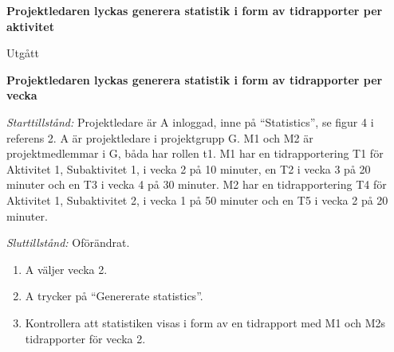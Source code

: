 \documentclass[a4paper]{article}
\begin{document}
\begin{FT}
\item
\textbf{Projektledaren lyckas generera statistik i form av tidrapporter per aktivitet}

Utgått





\item
\textbf{Projektledaren lyckas generera statistik i form av tidrapporter per vecka}

\emph{Starttillstånd:} Projektledare är A inloggad, inne på ``Statistics'', se figur 4 i referens 2. A är projektledare i projektgrupp G. M1 och M2 är projektmedlemmar i G, båda har rollen t1. M1 har en tidrapportering T1 för Aktivitet 1, Subaktivitet 1, i vecka 2 på 10 minuter, en T2 i vecka 3 på 20 minuter och en T3 i vecka 4 på 30 minuter. M2 har en tidrapportering T4 för Aktivitet 1, Subaktivitet 2, i vecka 1 på 50 minuter och en T5 i vecka 2 på 20 minuter.

\emph{Sluttillstånd:} Oförändrat.

\begin{enumerate}
\item A väljer vecka 2.
\item A trycker på ``Genererate statistics''.
\item Kontrollera att statistiken visas i form av en tidrapport med M1 och M2s tidrapporter för vecka 2.
\end{enumerate}



\end{FT}
\end{document}
